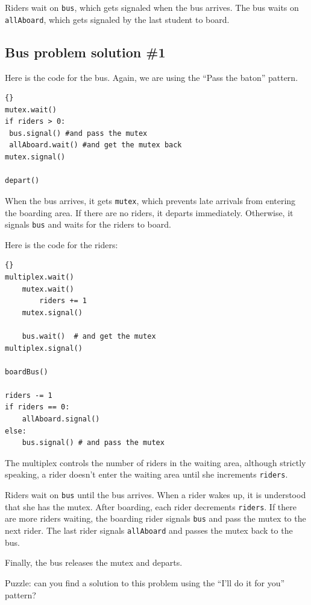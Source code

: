 \documentclass{book}
\begin{document}
Riders wait on
    {\tt bus}, which gets signaled when the bus arrives.  The
bus waits on {\tt allAboard}, which gets signaled by the last
student to board.



\subsection {Bus problem solution \#1}

Here is the code for the bus.  Again, we are using the
``Pass the baton'' pattern.

\newpage
\begin{lstlisting}[title={Bus problem solution (bus)}]{}
mutex.wait()
if riders > 0:
 bus.signal() #and pass the mutex
 allAboard.wait() #and get the mutex back
mutex.signal()

depart()
\end{lstlisting}

When the bus arrives, it gets {\tt mutex}, which
prevents late arrivals from entering the boarding area.  If there
are no riders, it departs immediately.  Otherwise, it signals {\tt bus}
and waits for the riders to board.

Here is the code for the riders:

\newpage
\begin{lstlisting}[title={Bus problem solution (riders)}]{}
multiplex.wait()
    mutex.wait()
        riders += 1
    mutex.signal()

    bus.wait()  # and get the mutex
multiplex.signal()

boardBus()

riders -= 1
if riders == 0:
    allAboard.signal() 
else:
    bus.signal() # and pass the mutex
\end{lstlisting}

The multiplex controls the number of riders in the waiting area,
although strictly speaking, a rider doesn't enter the waiting
area until she increments {\tt riders}.

Riders wait on {\tt bus} until the bus arrives.  When a rider
wakes up, it is understood that she has the mutex.
After boarding, each rider decrements {\tt riders}.  If there
are more riders waiting, the boarding rider signals {\tt bus}
and pass the mutex to the next rider.  The last rider signals
    {\tt allAboard} and passes the mutex back to the bus.

Finally, the bus releases the mutex and departs.

Puzzle: can you find a solution to this problem using the
``I'll do it for you'' pattern?
\end{document}
